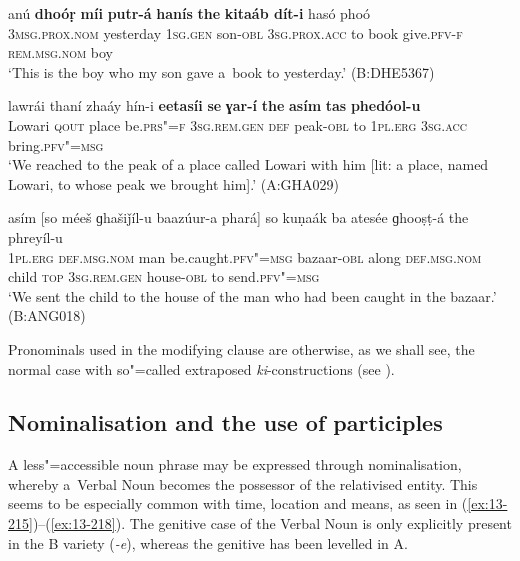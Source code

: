 \begin{exe}
\ex
\label{ex:13-212}
\gll anú \textbf{dhoóṛ} \textbf{míi} \textbf{putr-á} \textbf{hanís} \textbf{the} \textbf{ kitaáb dít-i} hasó phoó  \\
\textsc{3msg.prox.nom} yesterday \textsc{1sg.gen} son-\textsc{obl} \textsc{3sg.prox.acc} to  book give.\textsc{pfv-f} \textsc{rem.msg.nom} boy \\
\glt `This is the boy who my son gave a~book to yesterday.' (B:DHE5367)

\ex
\label{ex:13-213}
\gll lawrái thaní zhaáy hín-i    \textbf{eetasíi} \textbf{se} \textbf{ɣar-í} \textbf{the} \textbf{asím} \textbf{tas} \textbf{    phedóol-u}\\
Lowari \textsc{qout} place be.\textsc{prs"=f} \textsc{3sg.rem.gen} \textsc{def} peak-\textsc{obl} to \textsc{1pl.erg} \textsc{3sg.acc} bring.\textsc{pfv"=msg}\\
\glt `We reached to the peak of a place called Lowari with him [lit: a place, named Lowari, to whose peak we brought him].' (A:GHA029)

\ex
\label{ex:13-214}
\gll asím [so méeš ɡhašiǰíl-u baazúur-a  phará] so kuṇaák ba atesée
ɡhooṣṭ-á  the phreyíl-u \\
\textsc{1pl.erg} \textsc{def.msg.nom} man be.caught.\textsc{pfv"=msg} bazaar-\textsc{obl} along \textsc{def.msg.nom} child \textsc{top} \textsc{3sg.rem.gen} house-\textsc{obl} to send.\textsc{pfv"=msg} \\
\glt `We sent the child to the house of the man who had been caught in the bazaar.' (B:ANG018) 
\end{exe}

Pronominals used in the modifying clause are otherwise, as we shall see, the normal case with so"=called extraposed \textit{ki}-constructions (see ). 


\subsection{Nominalisation and the use of participles}
\label{subsec:13-6-6}

A less"=accessible noun phrase may be expressed through nominalisation, whereby a~Verbal Noun becomes the possessor of the relativised entity. This seems to be especially common with time, location and means, as seen in (\ref{ex:13-215})--(\ref{ex:13-218}). The genitive case of the Verbal Noun is only explicitly present in the B variety (\textit{-e}), whereas the genitive has been levelled in A.

